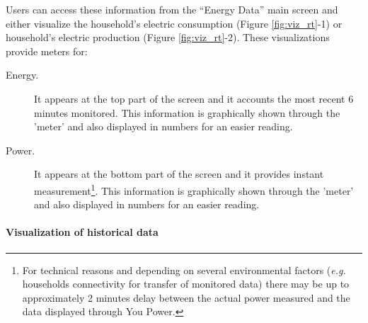 Users can access these information from the ``Energy Data'' main screen and either visualize the household's electric consumption (Figure \ref{fig:viz_rt}-1) or
household's electric production (Figure \ref{fig:viz_rt}-2).
These visualizations provide meters for:
\begin{description}
 \item[Energy.] It appears at the top part of the screen and it accounts the most recent 6 minutes monitored.
 This information is graphically shown through the 'meter' and also displayed in numbers for an easier reading.
 \item[Power.] It appears at the bottom part of the screen and it provides instant measurement\footnote{For technical reasons and depending on several environmental factors (\textit{e.g.} households connectivity for transfer of monitored data) there may be up to approximately 2 minutes delay between the actual power measured and the data displayed through You Power.}.
 This information is graphically shown through the 'meter' and also displayed in numbers for an easier reading.
\end{description}



\paragraph{Visualization of historical data} 

